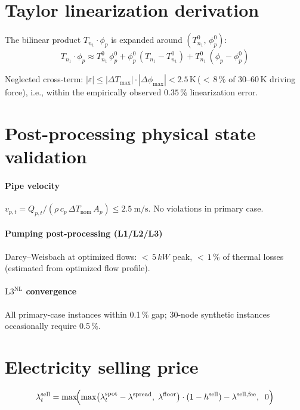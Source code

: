 \documentclass[review,3p]{elsarticle}
\newcommand{\Lnl}{\mathrm{L3}^{\mathrm{NL}}}
\begin{document}
\section{Taylor linearization derivation}
\label{app:taylor_derivation}

The bilinear product $T_{n_1} \cdot \phi_p$ is expanded around
$(T_{n_1}^0,\, \phi_p^0)$:
\begin{equation}
  T_{n_1} \cdot \phi_p \approx
    T_{n_1}^0\, \phi_p^0
    + \phi_p^0\, (T_{n_1} - T_{n_1}^0)
    + T_{n_1}^0\, (\phi_p - \phi_p^0)
\end{equation}

Neglected cross-term:
$|\varepsilon| \leq |\Delta T_{\max}| \cdot |\Delta \phi_{\max}|
< 2.5$\,K\,(${<}\,8\,\%$ of 30--60\,K driving force), i.e.,
within the empirically observed $0.35\,\%$ linearization error.

\section{Post-processing physical state validation}
\label{app:state_validation}

\paragraph{Pipe velocity}
$v_{p,t} = Q_{p,t} / (\rho\, c_p\, \Delta T_{\mathrm{nom}}\, A_p)
\leq \SI{2.5}{\metre\per\second}$. No violations in primary case.

\paragraph{Pumping post-processing (L1/L2/L3)}
Darcy--Weisbach at optimized flows: ${<}\,5\,kW$ peak,
${<}\,1\,\%$ of thermal losses (estimated from optimized flow profile).

\paragraph{$\Lnl$ convergence}
All primary-case instances within 0.1\,\% gap; 30-node synthetic
instances occasionally require 0.5\,\%.

\section{Electricity selling price}
\label{app:selling_price}

\begin{equation}
  \lambda_t^{\mathrm{sell}} = \max\!\Bigl(
    \max\bigl(\lambda_t^{\mathrm{spot}}
      - \lambda^{\mathrm{spread}},\;
      \lambda^{\mathrm{floor}}\bigr)
    \cdot (1 - h^{\mathrm{sell}})
    - \lambda^{\mathrm{sell,fee}},\;\; 0\Bigr)
\end{equation}
\end{document}
